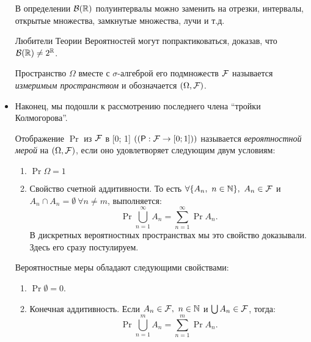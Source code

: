 \begin{itemize}
        \begin{exercise}
            В определении \(\mathcal{B}(\mathbb{R})\) полуинтервалы можно заменить на отрезки, интервалы, открытые множества, замкнутые множества, лучи и т.д.
            
            Любители Теории Вероятностей  могут попрактиковаться, доказав, что \(\mathcal{B}(\mathbb{R}) \neq 2^{\mathbb{R}}\).
            
        \end{exercise}
    
        \begin{definition}
            Пространство $ \Omega $ вместе с $ \sigma $-алгеброй его подмножеств $ \mathcal{F} $ называется \emph{измеримым пространством} и обозначается \((\Omega, \mathcal{F})\).
        \end{definition}
    
    \item Наконец, мы подошли к рассмотрению последнего члена ``тройки Колмогорова''. 
        
        \begin{definition}
            Отображение $ \Pr $ из $ \mathcal{F} $ в [0; 1] \(\left( (\Pr: \F \to [0; 1]) \right)\) называется \emph{вероятностной мерой} на \( (\Omega, \mathcal{F}) \), если оно удовлетворяет следующим двум условиям:
                \begin{enumerate}
                    \item \(\Pr{\Omega} = 1  \)
                    
                    \item Свойство счетной аддитивности. То есть \( \forall \{A_n,\ n \in \mathbb{N} \},\ A_n \in \mathcal{F}  \) и \(A_n \cap A_n = \emptyset\  \forall n \neq m \), выполняется: \[\Pr{\bigcup\limits_{n = 1}^{\infty}A_n} = \sum\limits_{n = 1}^{\infty}\Pr{A_n}.
                    \] В дискретных вероятностных пространствах мы это свойство доказывали. Здесь его сразу постулируем.
                    
                \end{enumerate} 
        \end{definition}     
       
   \begin{lemma}
        Вероятностные меры обладают следующими свойствами:
        \begin{enumerate}
            \item \(\Pr{\emptyset} = 0 \).
            
            \item Конечная аддитивность. Если \(A_n \in \mathcal{F},\ n \in \mathbb{N}  \) и \(\bigcup A_n \in \mathcal{F} \), тогда:
            \[
                \Pr{\bigcup\limits_{n = 1}^{m}A_n} = \sum\limits_{n = 1}^{m}\Pr{A_n}.
            \]
            

\end{enumerate}
\end{lemma}
\end{itemize}
